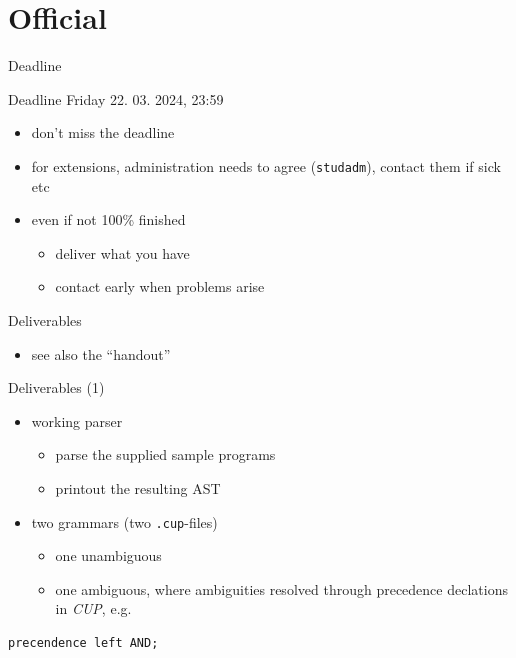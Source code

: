 \documentclass{beamer}
\begin{document}
\chapter{Official}
\label{sec:org853e714}

\begin{frame}[label={sec:org1b2050e},fragile]{Deadline}
 \begin{alertblock}{Deadline}
\alert{Friday 22. 03. 2024, 23:59}
\end{alertblock}
\begin{itemize}
\item don't miss the deadline
\item for extensions, administration needs to agree (\texttt{studadm}), contact them
if sick etc
\item even if not 100\% finished
\begin{itemize}
\item deliver what you have
\item contact early when problems arise
\end{itemize}
\end{itemize}
\end{frame}
\begin{frame}[label={sec:org58a8bcb},fragile]{Deliverables}
 \begin{itemize}
\item see also the ``handout''
\end{itemize}
\begin{block}{Deliverables (1)}
\begin{itemize}
\item working \alert{parser}
\begin{itemize}
\item parse the supplied sample programs
\item printout the resulting AST
\end{itemize}

\item \alert{two} grammars (two \texttt{.cup}-files)

\begin{itemize}
\item one unambiguous
\item one ambiguous, where ambiguities resolved through precedence
declations in \emph{CUP}, e.g.
\end{itemize}
\end{itemize}

\begin{verbatim}
precendence left AND;
\end{verbatim}
\end{block}
\end{frame}
\end{document}
